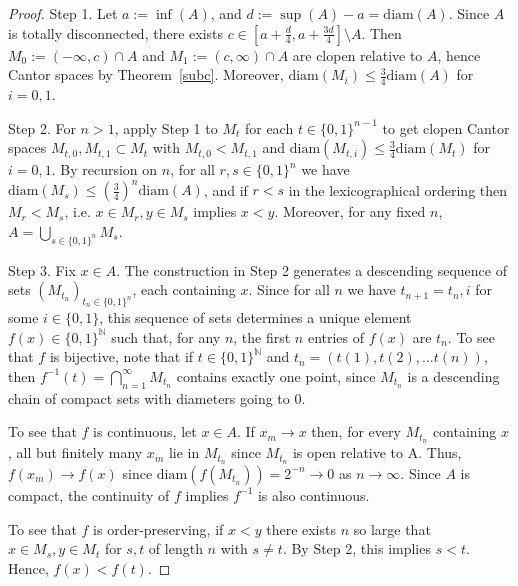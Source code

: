 \documentclass{article}
\newcommand{\diam}{\mathrm{diam}}
\begin{document}
\begin{proof}
Step 1. Let $a := \inf (A)$, and $d := \sup (A) - a = \mathrm{diam}(A)$. Since $A$ is totally disconnected, there exists $c \in [a + \frac d 4, a + \frac {3d} 4] \setminus A$. Then $M_0 := (-\infty, c) \cap A $ and $M_1 := (c, \infty) \cap A$ are clopen relative to $A$, hence Cantor spaces by Theorem~\ref{subc}. Moreover, $\mathrm{diam}(M_i) \leq \frac 3 4 \mathrm{diam}(A)$ for $i = 0,1$.

Step 2. For $n > 1$, apply Step 1 to $M_t$ for each $t \in {\{0,1\}}^{n-1}$ to get clopen Cantor spaces $M_{t,0}, M_{t,1} \subset M_t$ with $M_{t,0} < M_{t,1}$ and $\mathrm{diam}(M_{t,i}) \leq \frac 3 4 \mathrm{diam}(M_t)$ for $i=0,1$. By recursion on $n$, for all $r,s \in {\{0,1\}}^n$ we have $\mathrm{diam}(M_s) \leq \left(\frac 3 4\right)^n \mathrm{diam} (A)$, and if $r < s$ in the lexicographical ordering then $M_r < M_s$, i.e. $x \in M_r, y\in M_s$  implies $x < y$. Moreover, for any fixed $n$, $A = \bigcup_{s \in {\{0,1\}}^n} M_s$.

Step 3. Fix $x \in A$. The construction in Step 2 generates a descending sequence of sets ${\left(M_{t_n}\right)}_{t_n \in {\{0,1\}}^n}$, each containing $x$. Since for all $n$ we have $t_{n+1} =t_n,i$ for some $i \in \{0,1\}$, this sequence of sets determines a unique element $f(x) \in {\{0,1\}}^\mathbb{N}$ such that, for any $n$, the first $n$ entries of $f(x)$ are $t_n$. To see that $f$ is bijective, note that if $t \in {\{0,1\}}^\mathbb{N}$ and $t_n = (t(1), t(2), ... t(n))$, then $f^{-1}(t) = \bigcap_{n = 1}^\infty {M_{t_n}}$ contains exactly one point, since $M_{t_n}$ is a descending chain of compact sets with diameters going to $0$.

To see that $f$ is continuous, let $x \in A$. If $x_m \rightarrow x$ then, for every $M_{t_n}$ containing $x$, all but finitely many $x_m$ lie in $M_{t_n}$ since $M_{t_n}$ is open relative to A. Thus, $f(x_m) \rightarrow f(x)$ since $\diam(f(M_{t_n})) = 2^{-n} \rightarrow 0$ as $n \rightarrow \infty$. Since $A$ is compact, the continuity of $f$ implies $f^{-1}$ is also continuous.

To see that $f$ is order-preserving, if $x < y$ there exists $n$ so large that $x \in M_s, y \in M_t$ for $s,t$ of length $n$ with $s \neq t$. By Step 2, this implies $s < t$.
Hence, $f(x) < f(t)$.
\end{proof}
\end{document}
